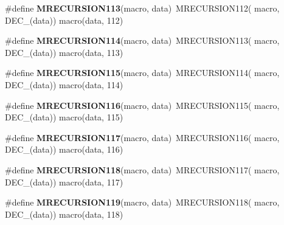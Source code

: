 \begin{DoxyCompactItemize}
\item 
\hypertarget{group__group__sam0__utils__mrecursion_ga4f47c8ada861a739b042e92989a455d6}{}\#define {\bfseries M\+R\+E\+C\+U\+R\+S\+I\+O\+N113}(macro,  data)~M\+R\+E\+C\+U\+R\+S\+I\+O\+N112(  macro, D\+E\+C\+\_\+(data))   macro(data, 112)\label{group__group__sam0__utils__mrecursion_ga4f47c8ada861a739b042e92989a455d6}

\item 
\hypertarget{group__group__sam0__utils__mrecursion_ga642f08b42d8b06e2c23282224fd77a28}{}\#define {\bfseries M\+R\+E\+C\+U\+R\+S\+I\+O\+N114}(macro,  data)~M\+R\+E\+C\+U\+R\+S\+I\+O\+N113(  macro, D\+E\+C\+\_\+(data))   macro(data, 113)\label{group__group__sam0__utils__mrecursion_ga642f08b42d8b06e2c23282224fd77a28}

\item 
\hypertarget{group__group__sam0__utils__mrecursion_ga1c977ad5b01e08a40d348d2ea87fedbb}{}\#define {\bfseries M\+R\+E\+C\+U\+R\+S\+I\+O\+N115}(macro,  data)~M\+R\+E\+C\+U\+R\+S\+I\+O\+N114(  macro, D\+E\+C\+\_\+(data))   macro(data, 114)\label{group__group__sam0__utils__mrecursion_ga1c977ad5b01e08a40d348d2ea87fedbb}

\item 
\hypertarget{group__group__sam0__utils__mrecursion_ga32fe65002e3a25cc50fb1344dbada748}{}\#define {\bfseries M\+R\+E\+C\+U\+R\+S\+I\+O\+N116}(macro,  data)~M\+R\+E\+C\+U\+R\+S\+I\+O\+N115(  macro, D\+E\+C\+\_\+(data))   macro(data, 115)\label{group__group__sam0__utils__mrecursion_ga32fe65002e3a25cc50fb1344dbada748}

\item 
\hypertarget{group__group__sam0__utils__mrecursion_ga7dd850bf5ab97978f6b7bd1b177d3368}{}\#define {\bfseries M\+R\+E\+C\+U\+R\+S\+I\+O\+N117}(macro,  data)~M\+R\+E\+C\+U\+R\+S\+I\+O\+N116(  macro, D\+E\+C\+\_\+(data))   macro(data, 116)\label{group__group__sam0__utils__mrecursion_ga7dd850bf5ab97978f6b7bd1b177d3368}

\item 
\hypertarget{group__group__sam0__utils__mrecursion_ga8559a2809b8bf465f91a9cf40bb88b16}{}\#define {\bfseries M\+R\+E\+C\+U\+R\+S\+I\+O\+N118}(macro,  data)~M\+R\+E\+C\+U\+R\+S\+I\+O\+N117(  macro, D\+E\+C\+\_\+(data))   macro(data, 117)\label{group__group__sam0__utils__mrecursion_ga8559a2809b8bf465f91a9cf40bb88b16}

\item 
\hypertarget{group__group__sam0__utils__mrecursion_gadc32038d19a1b3fafd088520e9b5e8d8}{}\#define {\bfseries M\+R\+E\+C\+U\+R\+S\+I\+O\+N119}(macro,  data)~M\+R\+E\+C\+U\+R\+S\+I\+O\+N118(  macro, D\+E\+C\+\_\+(data))   macro(data, 118)\label{group__group__sam0__utils__mrecursion_gadc32038d19a1b3fafd088520e9b5e8d8}


\end{DoxyCompactItemize}
